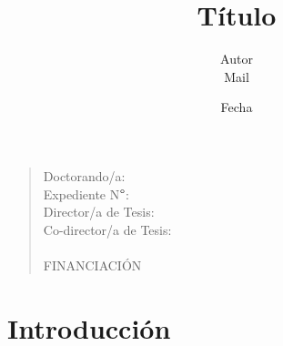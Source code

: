 \documentclass[a4paper, 12pt, twoside]{report} %
\title{Título}
\date{Fecha}
\author{Autor \\ Mail \\}
\begin{document}
\maketitle

\begin{quote}
Doctorando/a: \\
Expediente N$\degree$: \\
Director/a de Tesis: \\
Co-director/a de Tesis: \\
\\
FINANCIACIÓN
\end{quote}

\section{Introducción}

\cite{Abney:1987nounphrase}



%
%


\end{document}
